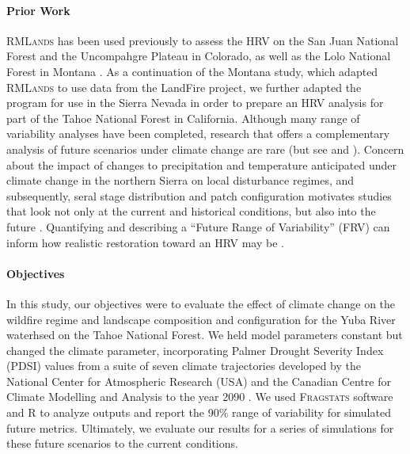 \documentclass[12pt]{article}
\begin{document}
\begin{spacing}{1}
\paragraph{Prior Work}
\textsc{RMLands} has been used previously to assess the HRV on the San Juan National Forest \citep{Mcgarigal2012} and the Uncompahgre Plateau \citep{Romme2009} in Colorado, as well as the Lolo National Forest in Montana \citep{Cushman2011}. As a continuation of the Montana study, which adapted \textsc{RMLands} to use data from the LandFire project, we further adapted the program for use in the Sierra Nevada in order to prepare an HRV analysis for part of the Tahoe National Forest in California. Although many range of variability analyses have been completed, research that offers a complementary analysis of future scenarios under climate change are rare (but see \cite{Keane2008} and \cite{Duveneck2014}). Concern about the impact of changes to precipitation and temperature anticipated under climate change in the northern Sierra on local disturbance regimes, and subsequently, seral stage distribution and patch configuration motivates studies that look not only at the current and historical conditions, but also into the future \citep{Fule2008,North2012}. Quantifying and describing a ``Future Range of Variability'' (FRV) can inform how realistic restoration toward an HRV may be \citep{Duncan2010}.

\paragraph{Objectives}
In this study, our objectives were to evaluate the effect of climate change on the wildfire regime and landscape composition and configuration for the Yuba River waterhsed on the Tahoe National Forest. We held model parameters constant but changed the climate parameter, incorporating Palmer Drought Severity Index (PDSI) values from a suite of seven climate trajectories developed by the National Center for Atmospheric Research (USA) and the Canadian Centre for Climate Modelling and Analysis to the year 2090 \citep{Cook2014}. We used \textsc{Fragstats} software and R to analyze outputs and report the 90\% range of variability for simulated future metrics. Ultimately, we evaluate our results for a series of simulations for these future scenarios to the current conditions. 


















\end{spacing}
\end{document}
